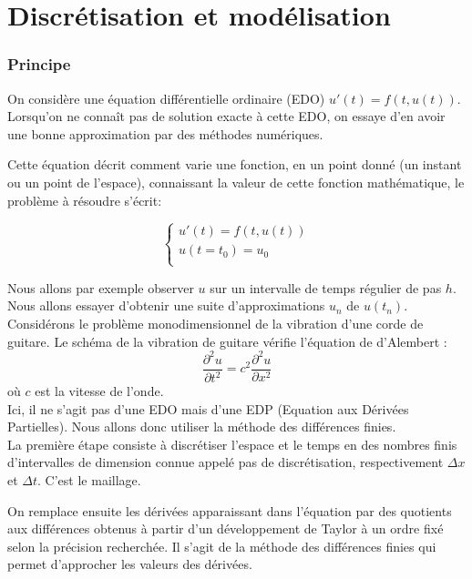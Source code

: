 \part{Discrétisation et modélisation}

\section{Principe}

On  considère  une  équation  différentielle  ordinaire  (EDO) $u'(t)=f(t,u(t))$. Lorsqu'on ne  connaît pas de solution exacte à cette EDO, on essaye d'en avoir une bonne approximation par  des méthodes numériques.

Cette équation décrit comment varie une fonction, en un point donné (un instant ou un point de l'espace), connaissant la valeur de cette fonction mathématique, le problème à résoudre s'écrit:

\begin{equation*}
\left \{
\begin{array}{rcl}
u'(t)=f(t,u(t))\\
u(t=t_0) = u_0 \\
\end{array}
\right.
\end{equation*}

Nous  allons par  exemple  observer  $u$  sur un intervalle de  temps
régulier de pas $h$. Nous  allons  essayer  d'obtenir  une suite  d'approximations  $u_n$  de
$u(t_n)$.\\

Considérons le problème monodimensionnel de la vibration d'une corde de guitare. Le schéma de la vibration de guitare vérifie l'équation de d'Alembert :
\begin{equation*}
\frac{\partial^2u}{\partial t^2} = c^{2}\frac{\partial^2u}{\partial x^2}
\end{equation*}
où $c$ est la vitesse de l'onde.\\

Ici, il ne s'agit pas d'une EDO mais d'une EDP (Equation aux Dérivées Partielles). Nous allons donc utiliser la méthode des différences finies.\\

La première étape consiste à discrétiser l'espace et le temps en des nombres finis d'intervalles de dimension connue appelé pas de discrétisation, respectivement $\Delta x$ et $\Delta t$. C'est le maillage.

On remplace ensuite les dérivées apparaissant dans l'équation par des quotients aux différences obtenus à partir d'un développement de Taylor à un ordre fixé selon la précision recherchée. Il s'agit de la méthode des différences finies qui permet d'approcher les valeurs des dérivées.\\


